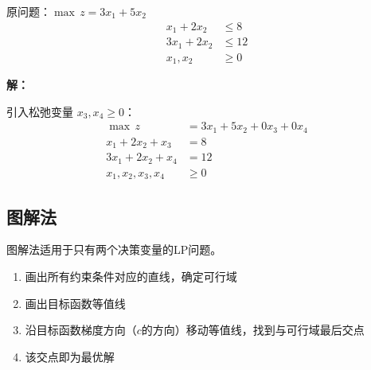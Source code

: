 \begin{example}[转标准型]
原问题：$\max \, z = 3x_1 + 5x_2$
\begin{align*}
x_1 + 2x_2 &\leq 8 \\
3x_1 + 2x_2 &\leq 12 \\
x_1, x_2 &\geq 0
\end{align*}

\textbf{解：}

引入松弛变量 $x_3, x_4 \geq 0$：
\begin{align*}
\max \, z &= 3x_1 + 5x_2 + 0x_3 + 0x_4 \\
x_1 + 2x_2 + x_3 &= 8 \\
3x_1 + 2x_2 + x_4 &= 12 \\
x_1, x_2, x_3, x_4 &\geq 0
\end{align*}
\end{example}

\subsection{图解法}\label{sec:graphical}

图解法适用于只有两个决策变量的LP问题。

\begin{algobox}[图解法步骤]
\begin{enumerate}
    \item 画出所有约束条件对应的直线，确定可行域
    \item 画出目标函数等值线
    \item 沿目标函数梯度方向（$c$的方向）移动等值线，找到与可行域最后交点
    \item 该交点即为最优解
\end{enumerate}
\end{algobox}

